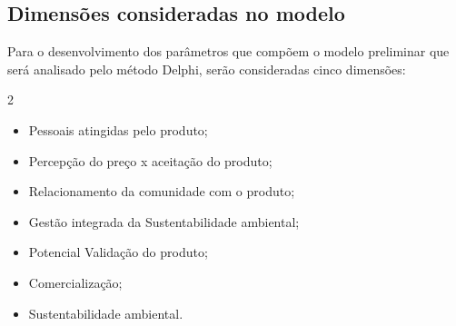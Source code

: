 



\subsection{Dimensões consideradas no modelo}


Para o desenvolvimento dos parâmetros que compõem o modelo preliminar que será analisado pelo método Delphi, serão consideradas cinco dimensões:

\begin{multicols}{2}
  \centering
  \begin{itemize}
    \item{Pessoais atingidas pelo produto;}
    \item{Percepção do preço x aceitação do produto;}
    \item{Relacionamento da comunidade com o produto;}
    \item{Gestão integrada da Sustentabilidade ambiental;}
    \item{Potencial Validação do produto;}
    \item{Comercialização;}
    \item{Sustentabilidade ambiental.}
  \end{itemize}
\end{multicols}

